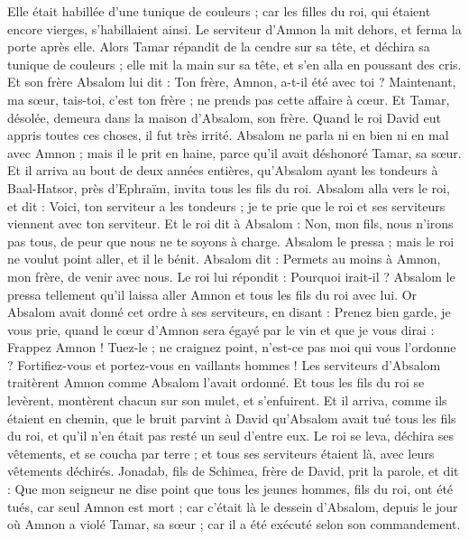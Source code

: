 \begin{multicols}{2}
Elle était habillée d'une tunique de couleurs ; car les filles du roi, qui étaient encore vierges, s'habillaient ainsi. Le serviteur d'Amnon la mit dehors, et ferma la porte après elle.
Alors Tamar répandit de la cendre sur sa tête, et déchira sa tunique de couleurs ; elle mit la main sur sa tête, et s'en alla en poussant des cris.
Et son frère Absalom lui dit : Ton frère, Amnon, a-t-il été avec toi ? Maintenant, ma sœur, tais-toi, c'est ton frère ; ne prends pas cette affaire à cœur. Et Tamar, désolée, demeura dans la maison d'Absalom, son frère.
Quand le roi David eut appris toutes ces choses, il fut très irrité.
Absalom ne parla ni en bien ni en mal avec Amnon ; mais il le prit en haine, parce qu'il avait déshonoré Tamar, sa sœur.
Et il arriva au bout de deux années entières, qu'Absalom ayant les tondeurs à Baal-Hatsor, près d'Ephraïm, invita tous les fils du roi.
Absalom alla vers le roi, et dit : Voici, ton serviteur a les tondeurs ; je te prie que le roi et ses serviteurs viennent avec ton serviteur.
Et le roi dit à Absalom : Non, mon fils, nous n'irons pas tous, de peur que nous ne te soyons à charge. Absalom le pressa ; mais le roi ne voulut point aller, et il le bénit.
Absalom dit : Permets au moins à Amnon, mon frère, de venir avec nous. Le roi lui répondit : Pourquoi irait-il ?
Absalom le pressa tellement qu'il laissa aller Amnon et tous les fils du roi avec lui.
Or Absalom avait donné cet ordre à ses serviteurs, en disant : Prenez bien garde, je vous prie, quand le cœur d'Amnon sera égayé par le vin et que je vous dirai : Frappez Amnon ! Tuez-le ; ne craignez point, n'est-ce pas moi qui vous l'ordonne ? Fortifiez-vous et portez-vous en vaillants hommes !
Les serviteurs d'Absalom traitèrent Amnon comme Absalom l'avait ordonné. Et tous les fils du roi se levèrent, montèrent chacun sur son mulet, et s'enfuirent.
Et il arriva, comme ils étaient en chemin, que le bruit parvint à David qu'Absalom avait tué tous les fils du roi, et qu'il n'en était pas resté un seul d'entre eux.
Le roi se leva, déchira ses vêtements, et se coucha par terre ; et tous ses serviteurs étaient là, avec leurs vêtements déchirés.
Jonadab, fils de Schimea, frère de David, prit la parole, et dit : Que mon seigneur ne dise point que tous les jeunes hommes, fils du roi, ont été tués, car seul Amnon est mort ; car c'était là le dessein d'Absalom, depuis le jour où Amnon a violé Tamar, sa sœur ; car il a été exécuté selon son commandement.

\end{multicols}
